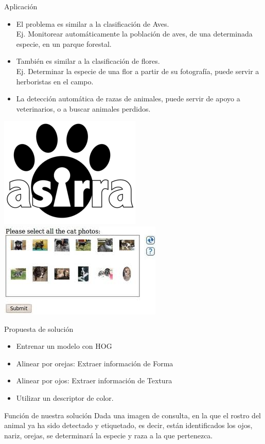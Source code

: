 \documentclass{beamer}
\begin{document}
	\begin{frame}{Aplicación}
		\begin{itemize}
			\item{El problema es similar a la clasificación de Aves.\\
			Ej. Monitorear automáticamente la población de aves, de una determinada especie, en un parque forestal.\\
			}
			\item{También es similar a la clasificación de  flores.\\
			Ej. Determinar la especie de una flor a partir de su fotografía, puede servir a herboristas en el campo.
			}
			\item{La detección automática de razas de animales, puede servir de apoyo a veterinarios, o a buscar animales perdidos.\\
			}
		\end{itemize}
            \includegraphics[scale=0.4]{imagen/asirra}
            \includegraphics[scale=0.4]{imagen/asirraT}
	\end{frame}
	\begin{frame}{Propuesta de solución}
\begin{itemize}
\item{
		Entrenar un modelo con HOG
}
\item{
		Alinear por orejas: Extraer información de Forma
}
\item{
		Alinear por ojos: Extraer información de Textura
}
\item{
		Utilizar un descriptor de color.
}
\end{itemize}
	\end{frame}
	\begin{frame}{Función de nuestra solución}
		Dada una imagen de consulta, en la que el rostro del animal ya ha sido
        detectado y etiquetado, es decir, están identificados los ojos, nariz,
        orejas, se determinará la especie y raza a la que pertenezca. 
	\end{frame}
\end{document}
